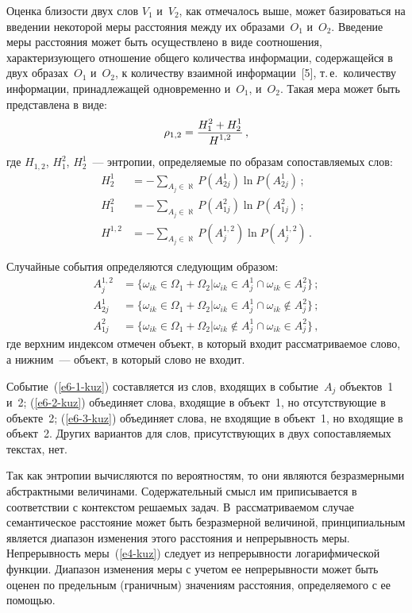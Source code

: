 \begin{multicols}{2}
     Оценка близости двух слов $V_1$ и~$V_2$, как отмечалось выше, может 
базироваться на введении некоторой меры расстояния между их 
образами~$O_1$ и~$O_2$. Введение меры расстояния может быть 
осуществлено в виде соотношения, характеризующего отношение общего 
количества информации, содержащейся в двух образах~$O_1$ и~$O_2$, к 
количеству взаимной информации~[5], т.\,е.\ количеству информации, 
принадлежащей одновременно и~$O_1$, и~$O_2$. Такая мера может быть 
представлена в виде: 
     \begin{equation}
     \rho_{1,2}=\displaystyle\frac{\displaystyle H_1^2+H_2^1\mathstrut}{\displaystyle H^{1,2}\mathstrut}\,,
     \label{e4-kuz}
     \end{equation}
где $H_{1,2}$, $H_1^2$, $H_2^1$~--- энтропии, определяемые по образам 
сопоставляемых слов:
\begin{align*}
H_2^1 &=-\sum\limits_{A_j\in \aleph} P\left(A^1_{2j}\right)\ln P\left(A^1_{2j}\right)\,;\\
H_1^2 &=-\sum\limits_{A_j\in \aleph} P\left(A^2_{1j}\right)\ln P\left(A^2_{1j}\right)\,;\\
H^{1,2} &=-\sum\limits_{A_j\in \aleph} P\left(A^{1,2}_{j}\right)\ln P\left(A^{1,2}_{j}\right)\,.
\end{align*}

     Случайные события определяются следующим образом:
     \begin{align}
     A_j^{1,2} &= \{\omega_{ik}\in \Omega_1+\Omega_2\vert \omega_{ik}\in 
A_j^1\cap \omega_{ik}\in A_j^2\}\,;\label{e6-1-kuz}\\
     A_{2j}^{1} &= \{\omega_{ik}\in \Omega_1+\Omega_2\vert \omega_{ik}\in 
A_j^1\cap \omega_{ik}\notin A_j^2\}\,;\label{e6-2-kuz}\\
     A_{1j}^{2} &= \{\omega_{ik}\in \Omega_1+\Omega_2\vert 
\omega_{ik}\notin A_j^1\cap \omega_{ik}\in A_j^2\}\,,\label{e6-3-kuz}
     \end{align}
где верхним индексом отмечен объект, в который входит рассматриваемое 
слово, а нижним~--- объект, в который слово не входит.
 
     Событие~(\ref{e6-1-kuz}) составляется из слов, входящих в 
событие~$A_j$ объектов~1 и~2; (\ref{e6-2-kuz}) объединяет слова, входящие в 
объект~1, но отсутствующие в объекте~2; (\ref{e6-3-kuz}) объединяет слова, не 
входящие в объект~1, но входящие в объект~2. Других вариантов для слов, 
присутствующих в двух сопоставляемых текстах, нет. 
     
     Так как энтропии вычисляются по вероятностям, то они являются 
безразмерными абстрактными величинами. Содержательный смысл им 
при\-пи\-сы\-ва\-ет\-ся в соответствии с контекстом ре\-шаемых задач. 
В~рассматриваемом случае семантическое расстояние может быть 
безразмерной величи\-ной, принципиальным является диапазон из\-ме\-не\-ния этого 
расстояния и непрерывность меры. Непрерывность меры~(\ref{e4-kuz}) следует 
из непрерывности логарифмической функции. Диапазон изменения меры с 
учетом ее непрерывности может быть оценен по предельным (граничным) 
значениям расстояния, определяемого с ее помощью. 
     

\end{multicols}
